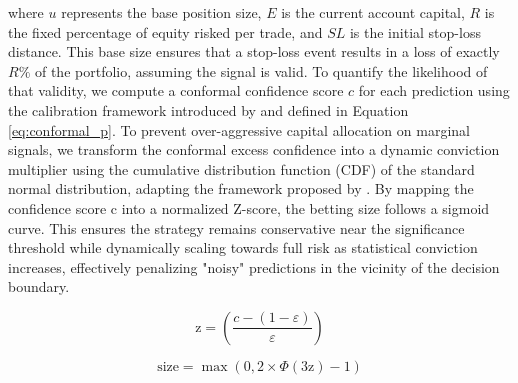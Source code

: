 \documentclass[12pt, a4paper]{article}
\begin{document}
where \(u\) represents the base position size, \(E\) is the current account capital, \(R\) is the fixed percentage of equity risked per trade, and \(SL\) is the initial stop-loss distance. 
This base size ensures that a stop-loss event results in a loss of exactly \(R\%\) of the portfolio, assuming the signal is valid. To quantify the likelihood of that validity, 
we compute a conformal confidence score \(c\) for each prediction using the calibration framework introduced by \textcite{shafer_tutorial_2008} and defined in Equation \ref{eq:conformal_p}. 
To prevent over-aggressive capital allocation on marginal signals, we transform the conformal excess confidence into a dynamic conviction multiplier using the 
cumulative distribution function (CDF) of the standard normal distribution, adapting the framework proposed by \textcite[143]{lopez_de_prado_advances_2018}. 
By mapping the confidence score c into a normalized Z-score, the betting size follows a sigmoid curve. This ensures the strategy remains conservative near the significance threshold 
while dynamically scaling towards full risk as statistical conviction increases, effectively penalizing "noisy" predictions in the vicinity of the decision boundary.

\begin{equation}
    \text{z} = \left( \frac{c - (1 - \varepsilon)}{\varepsilon} \right)
\end{equation}

\begin{equation}
    \text{size} = \max\left(0, 2 \times \varPhi(\text{3z}) - 1 \right)
    \label{eq:conviction_mult}
\end{equation}
\end{document}
